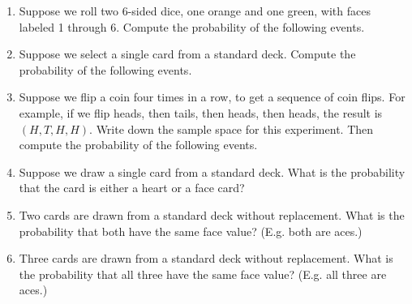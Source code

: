 \documentclass{article}
\begin{document}
\begin{enumerate}
  
\vspace{5cm}

\item Suppose we roll two 6-sided dice, one orange and one green, with faces labeled 1 through 6. Compute the probability of the following events.


  
\vspace{5cm}

\item Suppose we select a single card from a standard deck. Compute the probability of the following events.

  
\vspace{5cm}

\item Suppose we flip a coin four times in a row, to get a sequence of coin flips. For example, if we flip heads, then tails, then heads, then heads, the result is $(H,T,H,H)$. Write down the sample space for this experiment. Then compute the probability of the following events.

  
\vspace{5cm}

\item Suppose we draw a single card from a standard deck. What is the probability that the card is either a heart or a face card?

  
\vspace{5cm}

\item Two cards are drawn from a standard deck without replacement. What is the probability that both have the same face value? (E.g. both are aces.)

  
\vspace{5cm}

\item Three cards are drawn from a standard deck without replacement. What is the probability that all three have the same face value? (E.g. all three are aces.)

  
\vspace{5cm}
\end{enumerate}
\end{document}
